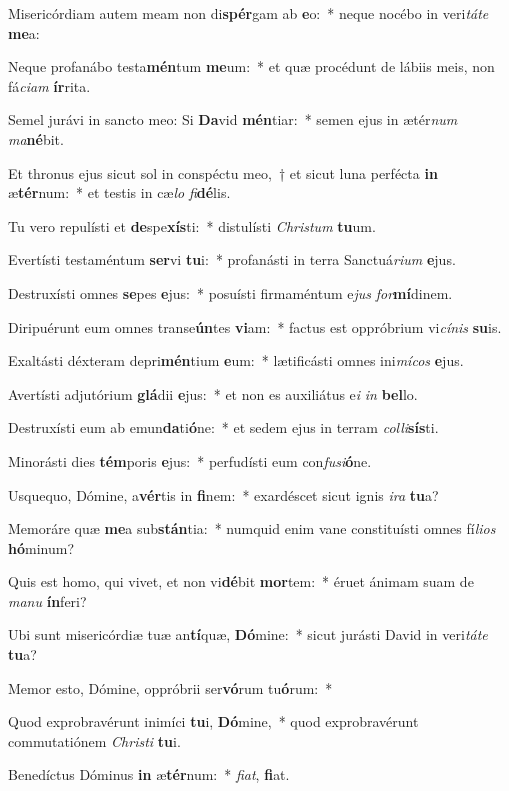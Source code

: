\item Misericórdiam autem meam non di\textbf{spér}gam ab \textbf{e}o:~* neque nocébo in veri\textit{tá}\textit{te} \textbf{me}a:
\item Neque profanábo testa\textbf{mén}tum \textbf{me}um:~* et quæ procédunt de lábiis meis, non fá\textit{ci}\textit{am} \textbf{ír}rita.
\item Semel jurávi in sancto meo: Si \textbf{Da}vid \textbf{mén}tiar:~* semen ejus in ætér\textit{num} \textit{ma}\textbf{né}bit.
\item Et thronus ejus sicut sol in conspéctu meo,~† et sicut luna perfécta \textbf{in} æ\textbf{tér}num:~* et testis in cæ\textit{lo} \textit{fi}\textbf{dé}lis.
\item Tu vero repulísti et \textbf{de}spe\textbf{xís}ti:~* distulísti \textit{Chris}\textit{tum} \textbf{tu}um.
\item Evertísti testaméntum \textbf{ser}vi \textbf{tu}i:~* profanásti in terra Sanctuá\textit{ri}\textit{um} \textbf{e}jus.
\item Destruxísti omnes \textbf{se}pes \textbf{e}jus:~* posuísti firmaméntum e\textit{jus} \textit{for}\textbf{mí}dinem.
\item Diripuérunt eum omnes transe\textbf{ún}tes \textbf{vi}am:~* factus est oppróbrium vi\textit{cí}\textit{nis} \textbf{su}is.
\item Exaltásti déxteram depri\textbf{mén}tium \textbf{e}um:~* lætificásti omnes ini\textit{mí}\textit{cos} \textbf{e}jus.
\item Avertísti adjutórium \textbf{glá}dii \textbf{e}jus:~* et non es auxiliátus e\textit{i} \textit{in} \textbf{bel}lo.
\item Destruxísti eum ab emun\textbf{da}ti\textbf{ó}ne:~* et sedem ejus in terram \textit{col}\textit{li}\textbf{sís}ti.
\item Minorásti dies \textbf{tém}poris \textbf{e}jus:~* perfudísti eum con\textit{fu}\textit{si}\textbf{ó}ne.
\item Usquequo, Dómine, a\textbf{vér}tis in \textbf{fi}nem:~* exardéscet sicut ignis \textit{i}\textit{ra} \textbf{tu}a?
\item Memoráre quæ \textbf{me}a sub\textbf{stán}tia:~* numquid enim vane constituísti omnes fí\textit{li}\textit{os} \textbf{hó}minum?
\item Quis est homo, qui vivet, et non vi\textbf{dé}bit \textbf{mor}tem:~* éruet ánimam suam de \textit{ma}\textit{nu} \textbf{ín}feri?
\item Ubi sunt misericórdiæ tuæ an\textbf{tí}quæ, \textbf{Dó}mine:~* sicut jurásti David in veri\textit{tá}\textit{te} \textbf{tu}a?
\item Memor esto, Dómine, oppróbrii ser\textbf{vó}rum tu\textbf{ó}rum:~* 
\item Quod exprobravérunt inimíci \textbf{tu}i, \textbf{Dó}mine,~* quod exprobravérunt commutatiónem \textit{Chris}\textit{ti} \textbf{tu}i.
\item Benedíctus Dóminus \textbf{in} æ\textbf{tér}num:~* \textit{fi}\textit{at}, \textbf{fi}at.
